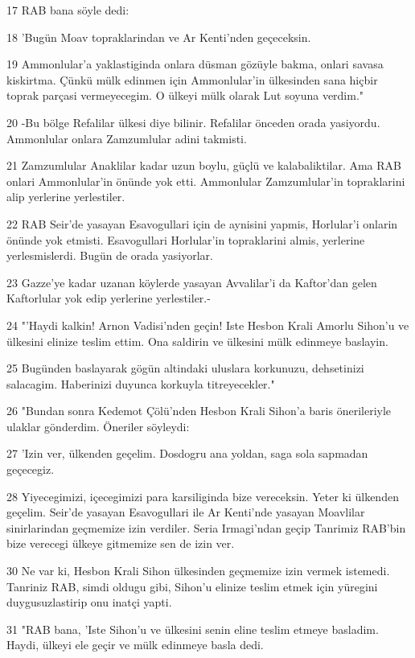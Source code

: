 \par 17 RAB bana söyle dedi:
\par 18 'Bugün Moav topraklarindan ve Ar Kenti'nden geçeceksin.
\par 19 Ammonlular'a yaklastiginda onlara düsman gözüyle bakma, onlari savasa kiskirtma. Çünkü mülk edinmen için Ammonlular'in ülkesinden sana hiçbir toprak parçasi vermeyecegim. O ülkeyi mülk olarak Lut soyuna verdim."
\par 20 -Bu bölge Refalilar ülkesi diye bilinir. Refalilar önceden orada yasiyordu. Ammonlular onlara Zamzumlular adini takmisti.
\par 21 Zamzumlular Anaklilar kadar uzun boylu, güçlü ve kalabaliktilar. Ama RAB onlari Ammonlular'in önünde yok etti. Ammonlular Zamzumlular'in topraklarini alip yerlerine yerlestiler.
\par 22 RAB Seir'de yasayan Esavogullari için de aynisini yapmis, Horlular'i onlarin önünde yok etmisti. Esavogullari Horlular'in topraklarini almis, yerlerine yerlesmislerdi. Bugün de orada yasiyorlar.
\par 23 Gazze'ye kadar uzanan köylerde yasayan Avvalilar'i da Kaftor'dan gelen Kaftorlular yok edip yerlerine yerlestiler.-
\par 24 "'Haydi kalkin! Arnon Vadisi'nden geçin! Iste Hesbon Krali Amorlu Sihon'u ve ülkesini elinize teslim ettim. Ona saldirin ve ülkesini mülk edinmeye baslayin.
\par 25 Bugünden baslayarak gögün altindaki uluslara korkunuzu, dehsetinizi salacagim. Haberinizi duyunca korkuyla titreyecekler."
\par 26 "Bundan sonra Kedemot Çölü'nden Hesbon Krali Sihon'a baris önerileriyle ulaklar gönderdim. Öneriler söyleydi:
\par 27 'Izin ver, ülkenden geçelim. Dosdogru ana yoldan, saga sola sapmadan geçecegiz.
\par 28 Yiyecegimizi, içecegimizi para karsiliginda bize vereceksin. Yeter ki ülkenden geçelim. Seir'de yasayan Esavogullari ile Ar Kenti'nde yasayan Moavlilar sinirlarindan geçmemize izin verdiler. Seria Irmagi'ndan geçip Tanrimiz RAB'bin bize verecegi ülkeye gitmemize sen de izin ver.
\par 30 Ne var ki, Hesbon Krali Sihon ülkesinden geçmemize izin vermek istemedi. Tanriniz RAB, simdi oldugu gibi, Sihon'u elinize teslim etmek için yüregini duygusuzlastirip onu inatçi yapti.
\par 31 "RAB bana, 'Iste Sihon'u ve ülkesini senin eline teslim etmeye basladim. Haydi, ülkeyi ele geçir ve mülk edinmeye basla dedi.
